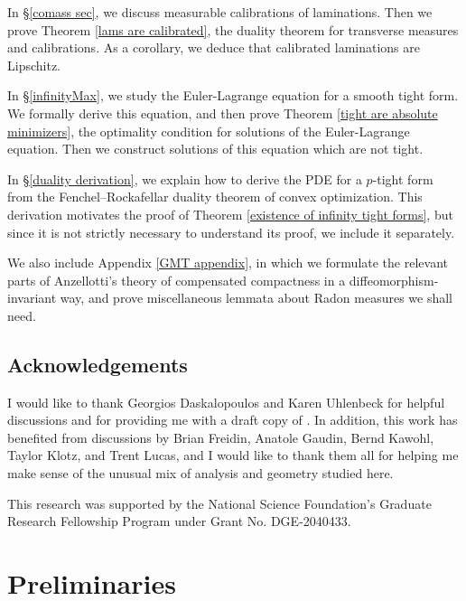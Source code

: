 \documentclass[reqno,11pt]{amsart}
\theoremstyle{definition}
\numberwithin{equation}{section}
\begin{document}
In \S\ref{comass sec}, we discuss measurable calibrations of laminations.
Then we prove Theorem \ref{lams are calibrated}, the duality theorem for transverse measures and calibrations.
As a corollary, we deduce that calibrated laminations are Lipschitz.


In \S\ref{infinityMax}, we study the Euler-Lagrange equation for a smooth tight form.
We formally derive this equation, and then prove Theorem \ref{tight are absolute minimizers}, the optimality condition for solutions of the Euler-Lagrange equation.
Then we construct solutions of this equation which are not tight.

In \S\ref{duality derivation}, we explain how to derive the PDE for a $p$-tight form from the Fenchel--Rockafellar duality theorem of convex optimization.
This derivation motivates the proof of Theorem \ref{existence of infinity tight forms}, but since it is not strictly necessary to understand its proof, we include it separately.

We also include Appendix \ref{GMT appendix}, in which we formulate the relevant parts of Anzellotti's theory of compensated compactness in a diffeomorphism-invariant way, and prove miscellaneous lemmata about Radon measures we shall need.


\subsection{Acknowledgements}
I would like to thank Georgios Daskalopoulos and Karen Uhlenbeck for helpful discussions and for providing me with a draft copy of \cite{daskalopoulos2023}.
In addition, this work has benefited from discussions by Brian Freidin, Anatole Gaudin, Bernd Kawohl, Taylor Klotz, and Trent Lucas, and I would like to thank them all for helping me make sense of the unusual mix of analysis and geometry studied here.

This research was supported by the National Science Foundation's Graduate Research Fellowship Program under Grant No. DGE-2040433.

\section{Preliminaries}\label{prelims}
\end{document}
